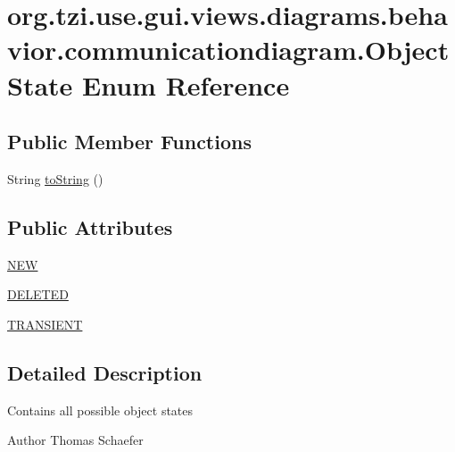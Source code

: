\hypertarget{enumorg_1_1tzi_1_1use_1_1gui_1_1views_1_1diagrams_1_1behavior_1_1communicationdiagram_1_1_object_state}{\section{org.\-tzi.\-use.\-gui.\-views.\-diagrams.\-behavior.\-communicationdiagram.\-Object\-State Enum Reference}
\label{enumorg_1_1tzi_1_1use_1_1gui_1_1views_1_1diagrams_1_1behavior_1_1communicationdiagram_1_1_object_state}
}
\subsection*{Public Member Functions}
\begin{DoxyCompactItemize}
\item 
String \hyperlink{enumorg_1_1tzi_1_1use_1_1gui_1_1views_1_1diagrams_1_1behavior_1_1communicationdiagram_1_1_object_state_a9736c2e5628e95859f0cd75d697c9999}{to\-String} ()
\end{DoxyCompactItemize}
\subsection*{Public Attributes}
\begin{DoxyCompactItemize}
\item 
\hyperlink{enumorg_1_1tzi_1_1use_1_1gui_1_1views_1_1diagrams_1_1behavior_1_1communicationdiagram_1_1_object_state_a22f0869a4e0476b86be42f87580b81c7}{N\-E\-W}
\item 
\hyperlink{enumorg_1_1tzi_1_1use_1_1gui_1_1views_1_1diagrams_1_1behavior_1_1communicationdiagram_1_1_object_state_ac62c45bad8cad607ff8cb6e7edcd6c18}{D\-E\-L\-E\-T\-E\-D}
\item 
\hyperlink{enumorg_1_1tzi_1_1use_1_1gui_1_1views_1_1diagrams_1_1behavior_1_1communicationdiagram_1_1_object_state_a5450f99f4f4d35054f57e7efda54a5ba}{T\-R\-A\-N\-S\-I\-E\-N\-T}
\end{DoxyCompactItemize}


\subsection{Detailed Description}
Contains all possible object states \begin{DoxyAuthor}{Author}
Thomas Schaefer 
\end{DoxyAuthor}


